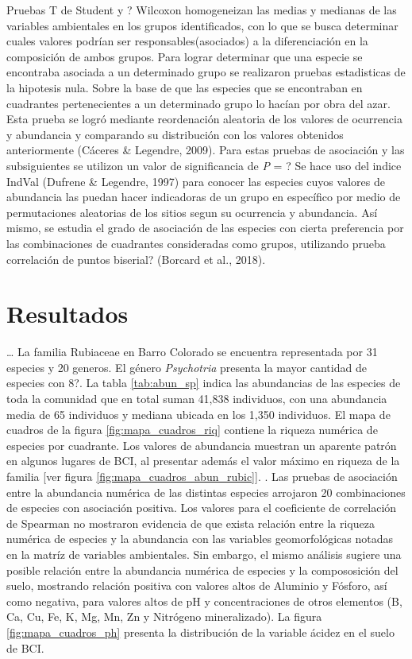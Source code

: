 \documentclass[11pt,]{article}
\begin{document}
Pruebas T de Student y ? Wilcoxon homogeneizan las medias y medianas de
las variables ambientales en los grupos identificados, con lo que se
busca determinar cuales valores podrían ser responsables(asociados) a la
diferenciación en la composición de ambos grupos. Para lograr determinar
que una especie se encontraba asociada a un determinado grupo se
realizaron pruebas estadisticas de la hipotesis nula. Sobre la base de
que las especies que se encontraban en cuadrantes pertenecientes a un
determinado grupo lo hacían por obra del azar. Esta prueba se logró
mediante reordenación aleatoria de los valores de ocurrencia y
abundancia y comparando su distribución con los valores obtenidos
anteriormente (Cáceres \& Legendre, 2009). Para estas pruebas de
asociación y las subsiguientes se utilizon un valor de significancia de
\emph{P} = ? Se hace uso del indice IndVal (Dufrene \& Legendre, 1997)
para conocer las especies cuyos valores de abundancia las puedan hacer
indicadoras de un grupo en específico por medio de permutaciones
aleatorias de los sitios segun su ocurrencia y abundancia. Así mismo, se
estudia el grado de asociación de las especies con cierta preferencia
por las combinaciones de cuadrantes consideradas como grupos, utilizando
prueba correlación de puntos biserial? (Borcard et al., 2018).

\section{Resultados}\label{resultados}

\dots
La familia Rubiaceae en Barro Colorado se encuentra representada por 31
especies y 20 generos. El género \emph{Psychotria} presenta la mayor
cantidad de especies con 8?. La tabla \ref{tab:abun_sp} indica las
abundancias de las especies de toda la comunidad que en total suman
41,838 individuos, con una abundancia media de 65 individuos y mediana
ubicada en los 1,350 individuos. El mapa de cuadros de la figura
\ref{fig:mapa_cuadros_riq} contiene la riqueza numérica de especies por
cuadrante. Los valores de abundancia muestran un aparente patrón en
algunos lugares de BCI, al presentar además el valor máximo en riqueza
de la familia {[}ver figura \ref{fig:mapa_cuadros_abun_rubic}{]}. . Las
pruebas de asociación entre la abundancia numérica de las distintas
especies arrojaron 20 combinaciones de especies con asociación positiva.
Los valores para el coeficiente de correlación de Spearman no mostraron
evidencia de que exista relación entre la riqueza numérica de especies y
la abundancia con las variables geomorfológicas notadas en la matríz de
variables ambientales. Sin embargo, el mismo análisis sugiere una
posible relación entre la abundancia numérica de especies y la
compososición del suelo, mostrando relación positiva con valores altos
de Aluminio y Fósforo, así como negativa, para valores altos de pH y
concentraciones de otros elementos (B, Ca, Cu, Fe, K, Mg, Mn, Zn y
Nitrógeno mineralizado). La figura \ref{fig:mapa_cuadros_ph} presenta la
distribución de la variable ácidez en el suelo de BCI.
\end{document}
